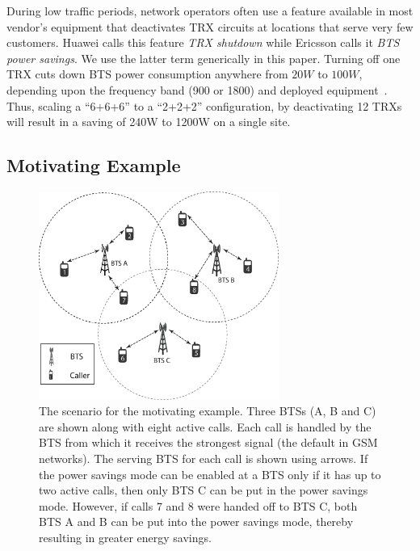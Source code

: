 During low traffic periods, network operators often use a feature available in most vendor's equipment that deactivates TRX circuits at locations that
serve very few customers. Huawei calls this feature \textit{TRX shutdown} while Ericsson calls it \textit{BTS power savings}. We use the latter term generically in this paper. Turning off one TRX cuts down BTS power consumption anywhere from $20W$
to $100W$, depending upon the frequency band (900 or 1800) and
deployed
equipment~\cite{Lorincz:BTS-Measure:Sensors:2012,flexibsc}.
Thus, scaling a ``6+6+6'' to a ``2+2+2'' configuration, by deactivating 12
TRXs will result in a saving of
240W to 1200W on a single site.

\subsection{Motivating Example}

\begin{figure}
\centering
\includegraphics[width=0.7\textwidth]{pics/ilyas3.eps}
\caption{The scenario for the motivating example. Three BTSs (A, B and C) are shown along with eight active calls. Each call is handled by the BTS from which it receives the strongest signal (the default in GSM networks). The serving BTS for each call is shown using arrows. If the power savings mode can be enabled at a BTS only if it has up to two active calls, then only BTS C can be put in the power savings mode. However, if calls 7 and 8 were handed off to BTS C, both BTS A and B can be put into the power savings mode, thereby resulting in greater energy savings.}
\label{fig:illustrationall}
\end{figure}

